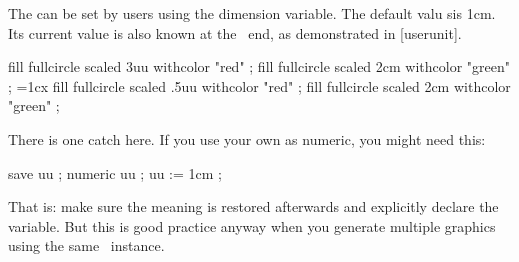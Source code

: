 \typebuffer[option=TEX]

\startlinecorrection
\getbuffer
\stoplinecorrection

The  can be set by users using the \type {\uunit} dimension variable.
The default valu sis 1cm. Its current value is also known at the \METAPOST\ end,
as demonstrated in  [userunit].

\startbuffer
\startcombination[nx=2,ny=1]
    \startcontent
        \uunit=1cm
        \framed[offset=1uu]
            \bgroup
                \startMPcode
                    fill fullcircle scaled 3uu withcolor "red"   ;
                    fill fullcircle scaled 2cm withcolor "green" ;
                \stopMPcode
            \egroup
    \stopcontent
    \startcaption
        \type {\uunit = 1cm}
    \stopcaption
    \startcontent
        \uunit=1cx
        \framed[offset=.1uu]
            \bgroup
                \startMPcode
                    fill fullcircle scaled .5uu withcolor "red"   ;
                    fill fullcircle scaled  2cm withcolor "green" ;
                \stopMPcode
            \egroup
    \stopcontent
    \startcaption
    \stopcaption
\stopcombination
\stopbuffer


\typebuffer[option=TEX]

There is one catch here. If you use your own  as numeric, you might
need this:

\starttyping[option=MP]
save uu ; numeric uu ; uu := 1cm ;
\stoptyping

That is: make sure the meaning is restored afterwards and explicitly declare the
variable. But this is good practice anyway when you generate multiple graphics
using the same \METAPOST\ instance.

\startplacefigure[reference=userunit,title={Shared user units in \TEX\ and \METAFUN.}]
    \getbuffer
\stopplacefigure

\stopsectionlevel

\stopdocument
